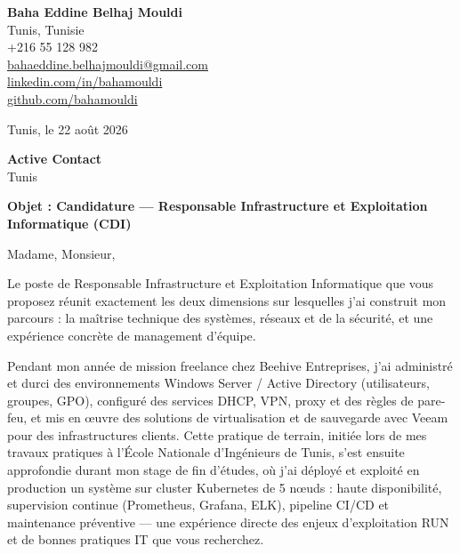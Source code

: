 \documentclass[a4paper,11pt]{article}
\begin{document}
\begin{flushright}
{\bfseries Baha Eddine Belhaj Mouldi}\\
Tunis, Tunisie\\
+216 55 128 982\\
\href{mailto:bahaeddine.belhajmouldi@gmail.com}{bahaeddine.belhajmouldi@gmail.com}\\
\href{https://linkedin.com/in/bahamouldi}{linkedin.com/in/bahamouldi}\\
\href{https://github.com/bahamouldi}{github.com/bahamouldi}
\end{flushright}

\vspace{0.8cm}

\begin{flushleft}
Tunis, le 22 août 2026

\vspace{0.8cm}

{\bfseries Active Contact}\\
Tunis

\vspace{0.6cm}

{\bfseries Objet : Candidature --- Responsable Infrastructure et Exploitation Informatique (CDI)}
\end{flushleft}

\vspace{0.6cm}

Madame, Monsieur,

Le poste de Responsable Infrastructure et Exploitation Informatique que vous proposez réunit exactement les deux dimensions sur lesquelles j'ai construit mon parcours : la maîtrise technique des systèmes, réseaux et de la sécurité, et une expérience concrète de management d'équipe.

Pendant mon année de mission freelance chez Beehive Entreprises, j'ai administré et durci des environnements Windows Server / Active Directory (utilisateurs, groupes, GPO), configuré des services DHCP, VPN, proxy et des règles de pare-feu, et mis en œuvre des solutions de virtualisation et de sauvegarde avec Veeam pour des infrastructures clients. Cette pratique de terrain, initiée lors de mes travaux pratiques à l'École Nationale d'Ingénieurs de Tunis, s'est ensuite approfondie durant mon stage de fin d'études, où j'ai déployé et exploité en production un système sur cluster Kubernetes de 5 nœuds : haute disponibilité, supervision continue (Prometheus, Grafana, ELK), pipeline CI/CD et maintenance préventive --- une expérience directe des enjeux d'exploitation RUN et de bonnes pratiques IT que vous recherchez.
\end{document}
